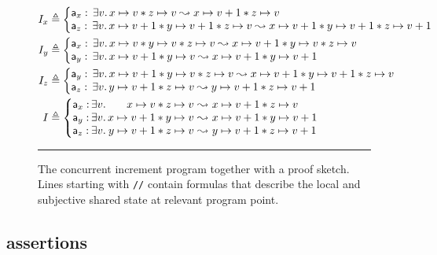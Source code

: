 \begin{figure*}
\begin{align*}
  I_x &\eqdef \left\{
  \begin{array}{@{}l@{}}
    \token a_x:\, \exsts{v} \cell{x}{v} * \cell{z}{v}  \swap  \cell{x}{v+1} * \cell{z}{v}\\
    \token a_z:\, \exsts{v} \cell{x}{v+1} * \cell{y}{v+1} * \cell{z}{v}\swap \cell{x}{v+1} * \cell{y}{v+1} * \cell{z}{v+1}
  \end{array}
  \right.\\
  I_y &\eqdef \left\{
  \begin{array}{@{}l@{}}
    \token a_x:\, \exsts{v} \cell{x}{v} * \cell{y}{v} * \cell{z}{v}  \swap  \cell{x}{v+1} * \cell{y}{v} * \cell{z}{v}\\
    \token a_y:\, \exsts{v} \cell{x}{v+1} *  \cell{y}{v}\swap \cell{x}{v+1} * \cell{y}{v+1}
  \end{array}
  \right.\\
  I_z &\eqdef \left\{
  \begin{array}{@{}l@{}}
    \token a_y:\, \exsts{v} \cell{x}{v+1} * \cell{y}{v} * \cell{z}{v}  \swap \cell{x}{v+1} * \cell{y}{v+1} * \cell{z}{v}\\
    \token a_z:\, \exsts{v} \cell{y}{v+1} *  \cell{z}{v}\swap \cell{y}{v+1} * \cell{z}{v+1}
  \end{array}
  \right.\\
  I &\eqdef \left\{
  \begin{array}{@{}l@{\,}l@{}r@{\ }c@{\ }l@{}}
    \token a_x: & \exsts{v} & \cell{x}{v} * \cell{z}{v} & \swap & \cell{x}{v+1} * \cell{z}{v}\\
    \token a_y: & \exsts{v} & \cell{x}{v+1} * \cell{y}{v} & \swap & \cell{x}{v+1} * \cell{y}{v+1}\\
    \token a_z: & \exsts{v} & \cell{y}{v+1} * \cell{z}{v} & \swap & \cell{y}{v+1} * \cell{z}{v+1}
  \end{array}\right.
\end{align*}

\hrule\vspace{5pt}
\caption{The concurrent increment program together with a \colosl proof
  sketch. Lines starting with \lstinline{//} contain formulas that describe
  the local and subjective shared state at relevant program point.}
\label{fig:concurrentInc}
\end{figure*}

\subsection{\colosl assertions}
\label{subsec:intuition}


